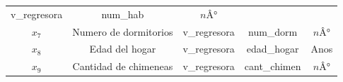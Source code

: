 \documentclass[
]{article}
\begin{document}
\begin{longtable}[]{@{}ccccc@{}}
\begin{minipage}[t]{0.22\columnwidth}
v\_regresora\strut
\end{minipage} & \begin{minipage}[t]{0.23\columnwidth}\centering
num\_hab\strut
\end{minipage} & \begin{minipage}[t]{0.06\columnwidth}\centering
\(nÂ°\)\strut
\end{minipage}\tabularnewline
\begin{minipage}[t]{0.13\columnwidth}\centering
\(x_7\)\strut
\end{minipage} & \begin{minipage}[t]{0.21\columnwidth}\centering
Numero de dormitorios\strut
\end{minipage} & \begin{minipage}[t]{0.22\columnwidth}\centering
v\_regresora\strut
\end{minipage} & \begin{minipage}[t]{0.23\columnwidth}\centering
num\_dorm\strut
\end{minipage} & \begin{minipage}[t]{0.06\columnwidth}\centering
\(nÂ°\)\strut
\end{minipage}\tabularnewline
\begin{minipage}[t]{0.13\columnwidth}\centering
\(x_8\)\strut
\end{minipage} & \begin{minipage}[t]{0.21\columnwidth}\centering
Edad del hogar\strut
\end{minipage} & \begin{minipage}[t]{0.22\columnwidth}\centering
v\_regresora\strut
\end{minipage} & \begin{minipage}[t]{0.23\columnwidth}\centering
edad\_hogar\strut
\end{minipage} & \begin{minipage}[t]{0.06\columnwidth}\centering
Anos\strut
\end{minipage}\tabularnewline
\begin{minipage}[t]{0.13\columnwidth}\centering
\(x_9\)\strut
\end{minipage} & \begin{minipage}[t]{0.21\columnwidth}\centering
Cantidad de chimeneas\strut
\end{minipage} & \begin{minipage}[t]{0.22\columnwidth}\centering
v\_regresora\strut
\end{minipage} & \begin{minipage}[t]{0.23\columnwidth}\centering
cant\_chimen\strut
\end{minipage} & \begin{minipage}[t]{0.06\columnwidth}\centering
\(nÂ°\)\strut
\end{minipage}\tabularnewline
\bottomrule
\end{longtable}
\end{document}
